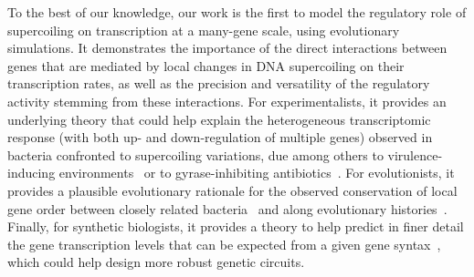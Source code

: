 To the best of our knowledge, our work is the first to model the regulatory role of supercoiling on transcription at a many-gene scale, using evolutionary simulations.
It demonstrates the importance of the direct interactions between genes that are mediated by local changes in DNA supercoiling on their transcription rates, as well as the precision and versatility of the regulatory activity stemming from these interactions.
For experimentalists, it provides an underlying theory that could help explain the heterogeneous transcriptomic response (with both up- and down-regulation of multiple genes) observed in bacteria confronted to supercoiling variations, due among others to virulence-inducing environments~\citep{dorman2019} or to gyrase-inhibiting antibiotics~\citep{delacampa2017}.
For evolutionists, it provides a plausible evolutionary rationale for the observed conservation of local gene order between closely related bacteria~\citep{junier2016} and along evolutionary histories~\citep{brinza2013}.
Finally, for synthetic biologists, it provides a theory to help predict in finer detail the gene transcription levels that can be expected from a given gene syntax~\citep{johnstone2022}, which could help design more robust genetic circuits.
